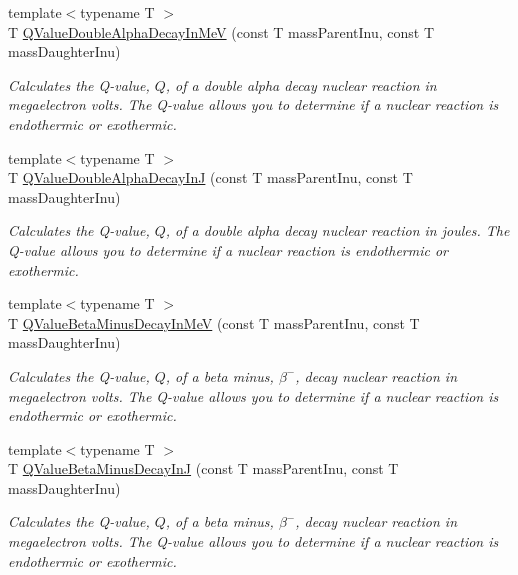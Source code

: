 \begin{DoxyCompactItemize}
{\footnotesize template$<$typename T $>$ }\\T \mbox{\hyperlink{group___e_g_x_phys-_q_value-_alpha_ga85230c793adc7fc78fef760874f75ad9}{Q\+Value\+Double\+Alpha\+Decay\+In\+MeV}} (const T mass\+Parent\+Inu, const T mass\+Daughter\+Inu)
\begin{DoxyCompactList}\small\item\em Calculates the Q-\/value, $Q$, of a double alpha decay nuclear reaction in megaelectron volts. The Q-\/value allows you to determine if a nuclear reaction is endothermic or exothermic. \end{DoxyCompactList}\item 
{\footnotesize template$<$typename T $>$ }\\T \mbox{\hyperlink{group___e_g_x_phys-_q_value-_alpha_ga015ade04346d0c6dae4dda8e3aab8cbd}{Q\+Value\+Double\+Alpha\+Decay\+InJ}} (const T mass\+Parent\+Inu, const T mass\+Daughter\+Inu)
\begin{DoxyCompactList}\small\item\em Calculates the Q-\/value, $Q$, of a double alpha decay nuclear reaction in joules. The Q-\/value allows you to determine if a nuclear reaction is endothermic or exothermic. \end{DoxyCompactList}\item 
{\footnotesize template$<$typename T $>$ }\\T \mbox{\hyperlink{group___e_g_x_phys-_q_value-_beta_minus_gaac1374ce9ba39bef416f34298708bda9}{Q\+Value\+Beta\+Minus\+Decay\+In\+MeV}} (const T mass\+Parent\+Inu, const T mass\+Daughter\+Inu)
\begin{DoxyCompactList}\small\item\em Calculates the Q-\/value, $Q$, of a beta minus, $\beta^-$, decay nuclear reaction in megaelectron volts. The Q-\/value allows you to determine if a nuclear reaction is endothermic or exothermic. \end{DoxyCompactList}\item 
{\footnotesize template$<$typename T $>$ }\\T \mbox{\hyperlink{group___e_g_x_phys-_q_value-_beta_minus_gae9a4a9f4c6e0f555e20c3144dd7329fc}{Q\+Value\+Beta\+Minus\+Decay\+InJ}} (const T mass\+Parent\+Inu, const T mass\+Daughter\+Inu)
\begin{DoxyCompactList}\small\item\em Calculates the Q-\/value, $Q$, of a beta minus, $\beta^-$, decay nuclear reaction in megaelectron volts. The Q-\/value allows you to determine if a nuclear reaction is endothermic or exothermic. \end{DoxyCompactList}\item 

\end{DoxyCompactItemize}

